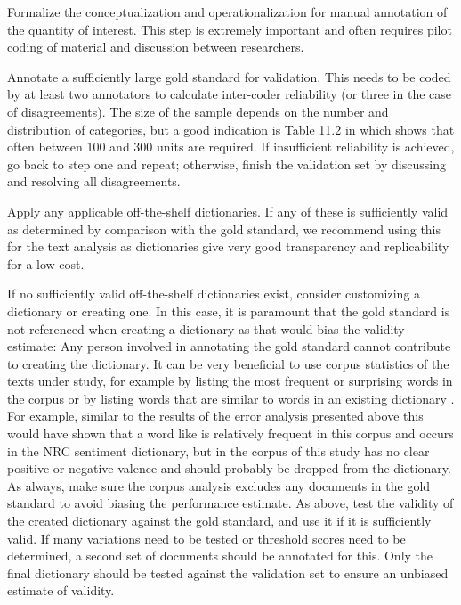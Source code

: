 \begin{APAenumerate}
\item Formalize the conceptualization and operationalization for manual annotation of the quantity of interest. 
  This step is extremely important and often requires pilot coding of material and discussion between researchers.
\item Annotate a sufficiently large gold standard for validation. 
  This needs to be coded by at least two annotators to calculate inter-coder reliability (or three in the case of disagreements). The size of the sample depends on the number and distribution of categories, but a good indication is Table 11.2 in \citet[p.240]{krippendorff12} which shows that often between 100 and 300 units are required. If insufficient reliability is achieved, go back to step one and repeat; otherwise, finish the validation set by discussing and resolving all disagreements. 
\item Apply any applicable off-the-shelf dictionaries. 
  If any of these is sufficiently valid as determined by comparison with the gold standard, we recommend using this for the text analysis as dictionaries give very good transparency and replicability for a low cost.
\item If no sufficiently valid off-the-shelf dictionaries exist, consider customizing a dictionary or creating one. 
  In this case, it is paramount that the gold standard is not referenced when creating a dictionary as that would bias the validity estimate: 
  Any person involved in annotating the gold standard cannot contribute to creating the dictionary.
  It can be very beneficial to use corpus statistics of the texts under study, for example by listing the most frequent or surprising words in the corpus or by listing words that are similar to words in an existing dictionary \citep{amsler20}. 
  For example, similar to the results of the error analysis presented above this would have shown that a word like  is relatively frequent in this corpus and occurs in the NRC sentiment dictionary, but in the corpus of this study has no clear positive or negative valence and should probably be dropped from the dictionary.
  As always, make sure the corpus analysis excludes any documents in the gold standard to avoid biasing the performance estimate.
  As above, test the validity of the created dictionary against the gold standard, and use it if it is sufficiently valid.
  If many variations need to be tested or threshold scores need to be determined, a second set of documents should be annotated for this. Only the final dictionary should be tested against the validation set to ensure an unbiased estimate of validity. 

\end{APAenumerate}

